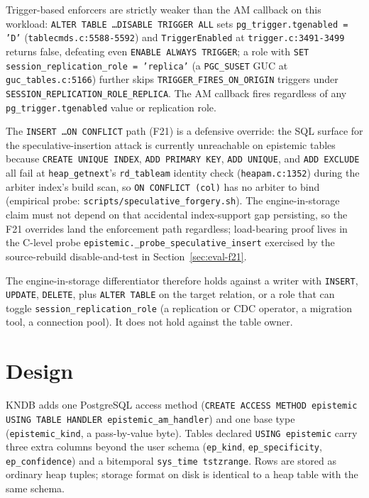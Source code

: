\documentclass[sigconf, nonacm]{acmart}
\begin{document}
Trigger-based enforcers are strictly weaker than the AM callback on this workload: \texttt{ALTER TABLE \dots DISABLE TRIGGER ALL} sets \texttt{pg\_trigger.tgenabled = 'D'} (\texttt{tablecmds.c:5588-5592}) and \texttt{TriggerEnabled} at \texttt{trigger.c:3491-3499} returns false, defeating even \texttt{ENABLE ALWAYS TRIGGER}; a role with \texttt{SET session\_replication\_role = 'replica'} (a \texttt{PGC\_SUSET} GUC at \texttt{guc\_tables.c:5166}) further skips \texttt{TRIGGER\_FIRES\_ON\_ORIGIN} triggers under \texttt{SESSION\_REPLICATION\_ROLE\_REPLICA}. The AM callback fires regardless of any \texttt{pg\_trigger.tgenabled} value or replication role.

The \texttt{INSERT \dots ON CONFLICT} path (F21) is a defensive override: the SQL surface for the speculative-insertion attack is currently unreachable on epistemic tables because \texttt{CREATE UNIQUE INDEX}, \texttt{ADD PRIMARY KEY}, \texttt{ADD UNIQUE}, and \texttt{ADD EXCLUDE} all fail at \texttt{heap\_getnext}'s \texttt{rd\_tableam} identity check (\texttt{heapam.c:1352}) during the arbiter index's build scan, so \texttt{ON CONFLICT (col)} has no arbiter to bind (empirical probe: \texttt{scripts/speculative\_forgery.sh}). The engine-in-storage claim must not depend on that accidental index-support gap persisting, so the F21 overrides land the enforcement path regardless; load-bearing proof lives in the C-level probe \texttt{epistemic.\_probe\_speculative\_insert} exercised by the source-rebuild disable-and-test in Section~\ref{sec:eval-f21}.

The engine-in-storage differentiator therefore holds against a writer with \texttt{INSERT}, \texttt{UPDATE}, \texttt{DELETE}, plus \texttt{ALTER TABLE} on the target relation, or a role that can toggle \texttt{session\_replication\_role} (a replication or CDC operator, a migration tool, a connection pool). It does not hold against the table owner.

\section{Design}
\label{sec:design}

KNDB adds one PostgreSQL access method (\texttt{CREATE ACCESS METHOD epistemic USING TABLE HANDLER epistemic\_am\_handler}) and one base type (\texttt{epistemic\_kind}, a pass-by-value byte). Tables declared \texttt{USING epistemic} carry three extra columns beyond the user schema (\texttt{ep\_kind}, \texttt{ep\_specificity}, \texttt{ep\_confidence}) and a bitemporal \texttt{sys\_time tstzrange}. Rows are stored as ordinary heap tuples; storage format on disk is identical to a heap table with the same schema.
\end{document}
